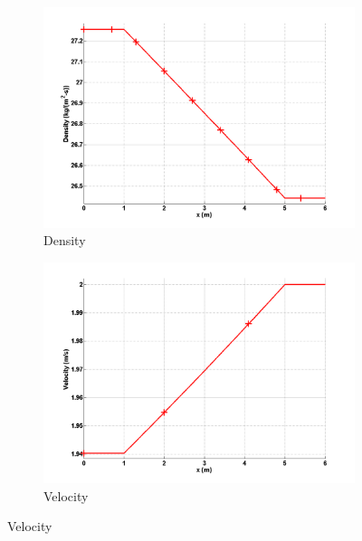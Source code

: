 \begin{figure}[H]
        \centering
        \begin{subfigure}[b]{0.495\textwidth}
                \centering
                \includegraphics[width=\textwidth]{figures/vapor_friction_density_source_terms.png}
                \caption{Density}
                \label{fig:1d-vapor-friction-density-sct3}
        \end{subfigure}%
        \begin{subfigure}[b]{0.495\textwidth}
                \centering
                \includegraphics[width=\textwidth]{figures/vapor_friction_velocity_source_terms.png}
                \caption{Velocity}
                \label{fig:1d-vapor-friction-velocity-sct3}
        \end{subfigure}


\end{figure}
